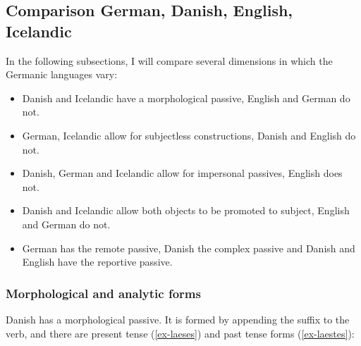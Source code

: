  \subsection{Comparison German, Danish, English, Icelandic}

In the following subsections, I will compare several dimensions in which the Germanic languages
vary:
\begin{itemize}
\item Danish and Icelandic have a morphological passive, English and German do not.

\item German, Icelandic allow for subjectless constructions, Danish and English do not.

\item Danish, German and Icelandic allow for impersonal passives, English does not.

\item Danish and Icelandic allow both objects to be promoted to subject, English and German do not.

\item German has the remote passive, Danish the complex passive and Danish and English
  have the reportive passive.
\end{itemize}



\subsubsection{Morphological and analytic forms}

Danish has a morphological passive. It is formed by appending the suffix  to the verb, and there
are present tense (\ref{ex-laeses}) and past tense forms (\ref{ex-laestes}):
\eal
{}
\zl

